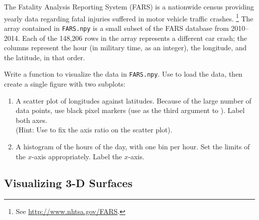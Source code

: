 \begin{problem} %
The Fatality Analysis Reporting System (FARS) is a nationwide census providing yearly data regarding fatal injuries suffered in motor vehicle traffic crashes.%
\footnote{See \url{http://www.nhtsa.gov/FARS}.}
The array contained in \texttt{FARS.npy} is a small subset of the FARS database from 2010--2014.
Each of the 148,206 rows in the array represents a different car crash; the columns represent the hour (in military time, as an integer), the longitude, and the latitude, in that order.

Write a function to visualize the data in \texttt{FARS.npy}.
Use  to load the data, then create a single figure with two subplots:
%
\begin{enumerate}
\item A scatter plot of longitudes against latitudes.
Because of the large number of data points, use black pixel markers (use  as the third argument to ).
Label both axes.
\\
(Hint: Use  to fix the axis ratio on the scatter plot).

\item A histogram of the hours of the day, with one bin per hour.
Set the limits of the $x$-axis appropriately.
Label the $x$-axis.
\end{enumerate}
\end{problem}


\subsection*{Visualizing 3-D Surfaces} %

